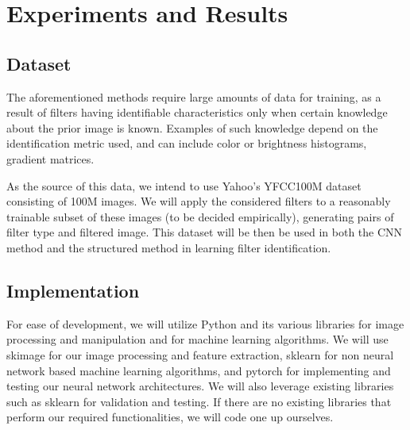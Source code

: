 \documentclass[a4paper, 11pt]{article}
\begin{document}

    


\section*{Experiments and Results}

\subsection*{Dataset}
The aforementioned methods require large amounts of data for training, as a result of filters having identifiable characteristics only when certain knowledge about the prior image is known. Examples of such knowledge depend on the identification metric used, and can include color or brightness histograms, gradient matrices.

As the source of this data, we intend to use Yahoo's YFCC100M dataset \cite{Yahoo} consisting of 100M images. We will apply the considered filters to a reasonably trainable subset of these images (to be decided empirically), generating pairs of filter type and filtered image. This dataset will be then be used in both the CNN method and the structured method in learning filter identification.

\subsection*{Implementation}
For ease of development, we will utilize Python and its various libraries for image processing and manipulation and for machine learning algorithms. We will use skimage for our image processing and feature extraction, sklearn for non neural network based machine learning algorithms, and pytorch for implementing and testing our neural network architectures. We will also leverage existing libraries such as sklearn for validation and testing. If there are no existing libraries that perform our required functionalities, we will code one up ourselves. 
\end{document}
